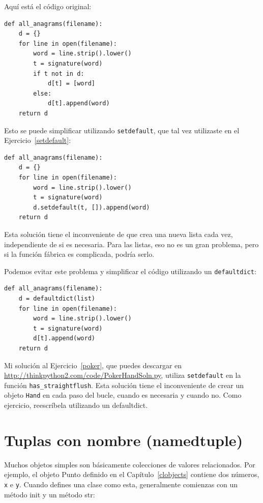 \documentclass[10pt]{book}
\begin{document}
Aquí está el código original:

\begin{verbatim}
def all_anagrams(filename):
    d = {}
    for line in open(filename):
        word = line.strip().lower()
        t = signature(word)
        if t not in d:
            d[t] = [word]
        else:
            d[t].append(word)
    return d
\end{verbatim}

Esto se puede simplificar utilizando {\tt setdefault}, que tal vez
utilizaste en el Ejercicio~\ref{setdefault}:

\begin{verbatim}
def all_anagrams(filename):
    d = {}
    for line in open(filename):
        word = line.strip().lower()
        t = signature(word)
        d.setdefault(t, []).append(word)
    return d
\end{verbatim}

Esta solución tiene el inconveniente de que crea una nueva lista
cada vez, independiente de si es necesaria.  Para las listas,
eso no es un gran problema, pero si la función
fábrica es complicada, podría serlo.

Podemos evitar este problema y
simplificar el código utilizando un {\tt defaultdict}:

\begin{verbatim}
def all_anagrams(filename):
    d = defaultdict(list)
    for line in open(filename):
        word = line.strip().lower()
        t = signature(word)
        d[t].append(word)
    return d
\end{verbatim}

Mi solución al Ejercicio~\ref{poker}, que puedes descargar en
\url{http://thinkpython2.com/code/PokerHandSoln.py},
utiliza {\tt setdefault} en la función
\verb"has_straightflush".  Esta solución tiene el inconveniente de
crear un objeto {\tt Hand} en cada paso del bucle, cuando
es necesaria y cuando no.  Como ejercicio, reescríbela utilizando
un defaultdict.


\section{Tuplas con nombre (namedtuple)}

Muchos objetos simples son básicamente colecciones de valores relacionados.
Por ejemplo, el objeto Punto definido en el Capítulo~\ref{clobjects} contiene
dos números, {\tt x} e {\tt y}.  Cuando defines una clase como
esta, generalmente comienzas con un método init y un método str:
\end{document}
